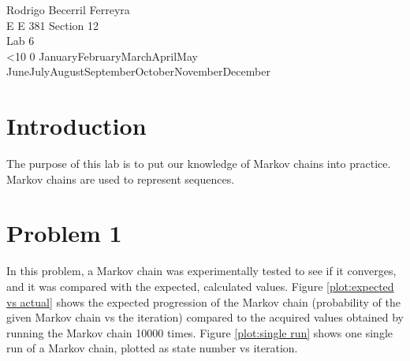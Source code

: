 \documentclass{article}
\renewcommand{\today}{\ifnum\number\day<10 0\fi \number\day \space%
\ifcase \month \or January\or February\or March\or April\or May%
\or June\or July\or August\or September\or October\or November\or December\fi\space%
\number \year}
\begin{document}
\noindent
Rodrigo Becerril Ferreyra\\
E E 381 Section 12\\
Lab 6\\
\today

\section*{Introduction} The purpose of this lab is to
put our knowledge of Markov chains into practice. Markov
chains are used to represent sequences.

\section{Problem 1}
In this problem, a Markov chain was experimentally tested
to see if it converges, and it was compared with the
expected, calculated values. Figure
\ref{plot:expected vs actual} shows the expected progression
of the Markov chain (probability of the given Markov chain vs
the iteration) compared to the acquired values obtained by
running the Markov chain \num{10000} times. Figure
\ref{plot:single run} shows one single run of a Markov chain,
plotted as state number vs iteration.
\end{document}
